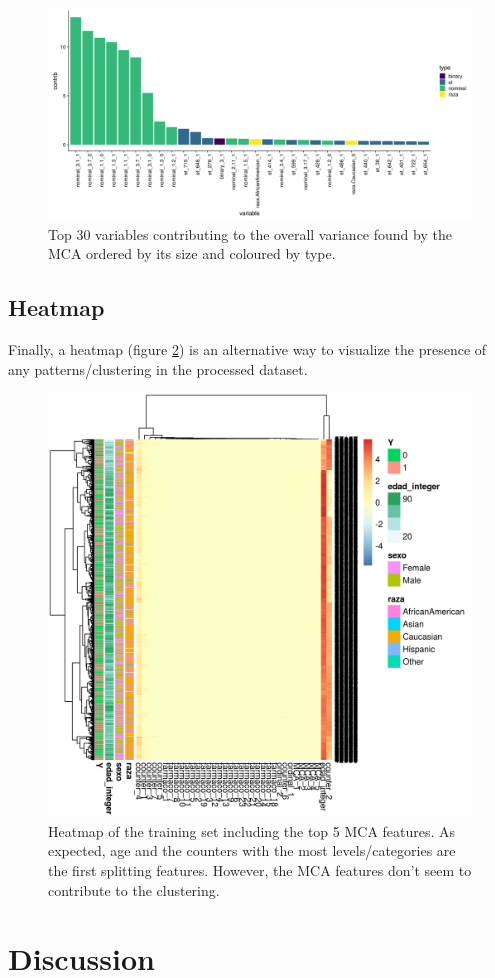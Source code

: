 \documentclass{article}\usepackage[]{graphicx}\usepackage[]{color}
\begin{document}
\begin{figure}[!h]
\centering
\includegraphics[width=\textwidth]{plots/etiqueta_mca_contrib}
\caption{Top 30 variables contributing to the overall variance found by the MCA ordered by its size and coloured by type.}
\label{fig:mca_contrib}
\end{figure}

\newpage
\subsection{Heatmap}

Finally, a heatmap (figure \ref{fig:heatmap}) is an alternative way to visualize the presence of any patterns/clustering in the processed dataset.

\begin{figure}[!h]
\centering
\includegraphics[width=.5\textwidth]{plots/heatmap}
\caption{Heatmap of the training set including the top 5 MCA features. As expected, age and the counters with the most levels/categories are the first splitting features. However, the MCA features don't seem to contribute to the clustering.}
\label{fig:heatmap}
\end{figure}

\section{Discussion}
\end{document}
